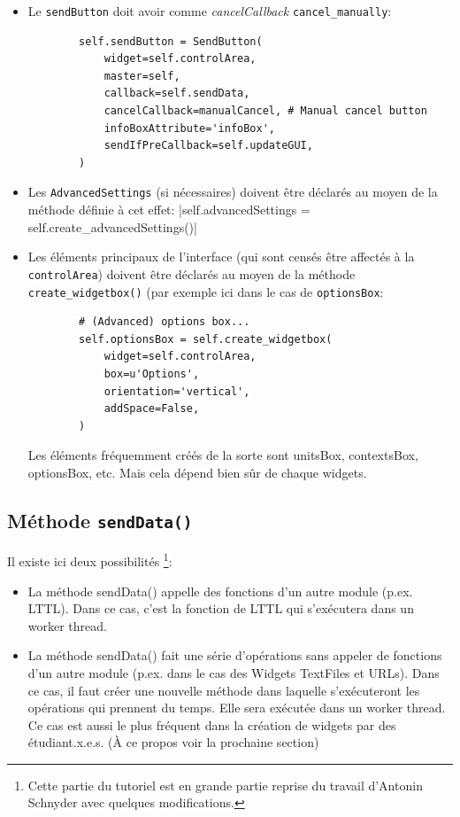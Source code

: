 \documentclass{article}
\begin{document}
\begin{itemize}
    \item Le \texttt{sendButton} doit avoir comme \textit{cancelCallback} \texttt{cancel\_manually}:
    \begin{verbatim}
        self.sendButton = SendButton(
            widget=self.controlArea,
            master=self,
            callback=self.sendData,
            cancelCallback=manualCancel, # Manual cancel button
            infoBoxAttribute='infoBox',
            sendIfPreCallback=self.updateGUI,
        )
    \end{verbatim}
    \item Les \texttt{AdvancedSettings} (si nécessaires) doivent être déclarés au moyen de la méthode définie à cet effet:
    |self.advancedSettings = self.create\_advancedSettings()|
    \item Les éléments principaux de l'interface (qui sont censés être affectés à la \texttt{controlArea}) doivent être déclarés au moyen de la méthode \texttt{create\_widgetbox()} (par exemple ici dans le cas de \texttt{optionsBox}: 
    \begin{verbatim}
        # (Advanced) options box...
        self.optionsBox = self.create_widgetbox(
            widget=self.controlArea,
            box=u'Options',
            orientation='vertical',
            addSpace=False,
        )
    \end{verbatim}
    Les éléments fréquemment créés de la sorte sont unitsBox, contextsBox, optionsBox, etc. Mais cela dépend bien sûr de chaque widgets.
\end{itemize}

\subsection{Méthode \texttt{sendData()}}

Il existe ici deux possibilités \footnote{Cette partie du tutoriel est en grande partie reprise du travail d'Antonin Schnyder avec quelques modifications.}:
\begin{itemize}
    \item La méthode sendData() appelle des fonctions d’un autre module (p.ex. LTTL). Dans ce cas, c'est la fonction de LTTL qui s’exécutera dans un worker thread.
    \item La méthode sendData() fait une série d’opérations sans appeler de fonctions d’un autre module (p.ex. dans le cas des Widgets TextFiles et URLs). Dans ce cas, il faut créer une nouvelle méthode dans laquelle s'exécuteront les opérations qui prennent du temps. Elle sera exécutée dans un worker thread. Ce cas est aussi le plus fréquent dans la création de widgets par des étudiant.x.e.s. (À ce propos voir la prochaine section)
\end{itemize}
\end{document}
